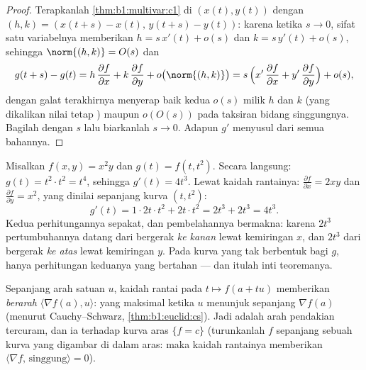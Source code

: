 \begin{proof}
Terapkanlah \cref{thm:b1:multivar:c1} di $(x(t), y(t))$ dengan $(h, k) =
(x(t+s) - x(t),\, y(t+s) - y(t))$: karena ketika $s \to 0$, sifat 
satu variabelnya memberikan $h = s\,x'(t) + o(s)$ dan $k = s\,y'(t)
+ o(s)$, sehingga $\norm{(h, k)} = O(s)$ dan
\[
g(t+s) - g(t)
= h\,\frac{\partial f}{\partial x} + k\,\frac{\partial
f}{\partial y} + o\bigl(\norm{(h,k)}\bigr)
= s\,\Bigl(x'\,\frac{\partial f}{\partial x} +
y'\,\frac{\partial f}{\partial y}\Bigr) + o(s) ,
\]
dengan galat terakhirnya menyerap baik kedua $o(s)$ milik $h$ dan $k$
(yang dikalikan nilai tetap ) maupun
$o(O(s))$ pada taksiran bidang singgungnya. Bagilah dengan $s$ lalu biarkanlah
$s \to 0$. Adapun  $g'$ menyusul dari  semua
bahannya.
\end{proof}

\begin{example}
\label{ex:b1:multivar:chainrun}
Misalkan $f(x, y) = x^2 y$ dan $g(t) = f(t, t^2)$. Secara langsung: $g(t) =
t^2\cdot t^2 = t^4$, sehingga $g'(t) = 4t^3$. Lewat kaidah rantainya:
$\frac{\partial f}{\partial x} = 2xy$ dan $\frac{\partial
f}{\partial y} = x^2$, yang dinilai sepanjang kurva $(t, t^2)$:
\[
g'(t) = 1\cdot 2t\cdot t^2 + 2t\cdot t^2 = 2t^3 + 2t^3 = 4t^3 .
\]
Kedua perhitungannya sepakat, dan pembelahannya bermakna: karena $2t^3$
pertumbuhannya datang dari bergerak \emph{ke kanan} lewat
kemiringan $x$, dan $2t^3$ dari bergerak \emph{ke atas} lewat
kemiringan $y$. Pada kurva yang tak berbentuk  bagi $g$, hanya
perhitungan keduanya yang bertahan --- dan itulah inti teoremanya.
\end{example}

\begin{remark}
Sepanjang arah satuan $u$, kaidah rantai pada $t \mapsto f(a + tu)$
memberikan \emph{ berarah} $\langle \nabla f(a),
u\rangle$: yang maksimal ketika $u$ menunjuk sepanjang $\nabla f(a)$ (menurut
Cauchy--Schwarz, \cref{thm:b1:euclid:cs}). Jadi  adalah
arah pendakian tercuram, dan ia  terhadap kurva
aras $\{f = c\}$ (turunkanlah $f$ sepanjang sebuah kurva yang digambar di dalam
 aras: maka kaidah rantainya memberikan $\langle\nabla f,\,
\text{singgung}\rangle = 0$).
\end{remark}

